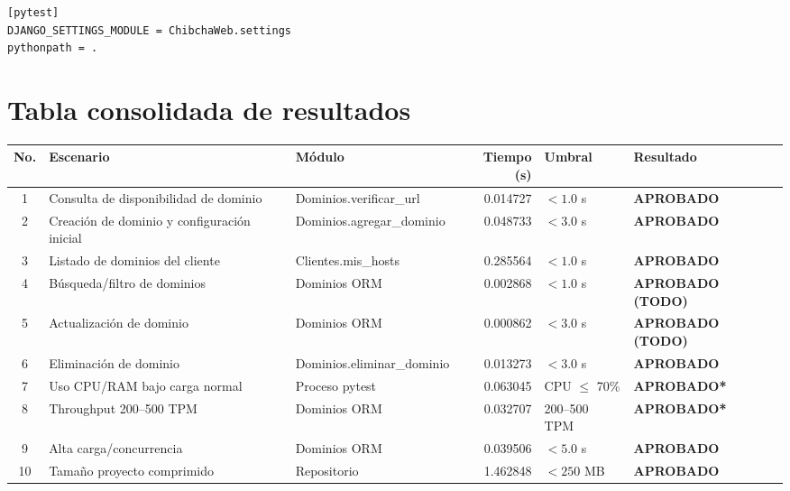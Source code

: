 \documentclass[12pt,a4paper]{article}
\newcommand{\aprobado}{\textcolor{aprobado}{\textbf{APROBADO}}}
\newcommand{\aprobadotodo}{\textcolor{aprobadotodo}{\textbf{APROBADO (TODO)}}}
\newcommand{\aprobadojust}{\textcolor{aprobadotodo}{\textbf{APROBADO*}}}
\begin{document}
\begin{lstlisting}[caption={Archivo pytest.ini}]
[pytest]
DJANGO_SETTINGS_MODULE = ChibchaWeb.settings
pythonpath = .
\end{lstlisting}

\newpage
\section{Tabla consolidada de resultados}

\begin{center}
\small
\begin{longtable}{c >{\raggedright}p{3.2cm} >{\raggedright}p{2.2cm} r >{\raggedright}p{2cm} >{\centering\arraybackslash}p{2.2cm}}
\toprule
\textbf{No.} & \textbf{Escenario} & \textbf{Módulo} & \textbf{Tiempo (s)} & \textbf{Umbral} & \textbf{Resultado} \\
\midrule
\endhead
1 & Consulta de disponibilidad de dominio
  & Dominios.verificar\_url & 0.014727 & $< 1.0$ s & \aprobado \\
2 & Creación de dominio y configuración inicial
  & Dominios.agregar\_dominio & 0.048733 & $< 3.0$ s & \aprobado \\
3 & Listado de dominios del cliente
  & Clientes.mis\_hosts & 0.285564 & $< 1.0$ s & \aprobado \\
4 & Búsqueda/filtro de dominios
  & Dominios ORM & 0.002868 & $< 1.0$ s & \aprobadotodo \\
5 & Actualización de dominio
  & Dominios ORM & 0.000862 & $< 3.0$ s & \aprobadotodo \\
6 & Eliminación de dominio
  & Dominios.eliminar\_dominio & 0.013273 & $< 3.0$ s & \aprobado \\
7 & Uso CPU/RAM bajo carga normal
  & Proceso pytest & 0.063045 & CPU $\leq$ 70\% & \aprobadojust \\
8 & Throughput 200--500 TPM
  & Dominios ORM & 0.032707 & 200--500 TPM & \aprobadojust \\
9 & Alta carga/concurrencia
  & Dominios ORM & 0.039506 & $< 5.0$ s & \aprobado \\
10 & Tamaño proyecto comprimido
  & Repositorio & 1.462848 & $< 250$ MB & \aprobado \\
\bottomrule
\end{longtable}
\end{center}
\end{document}
